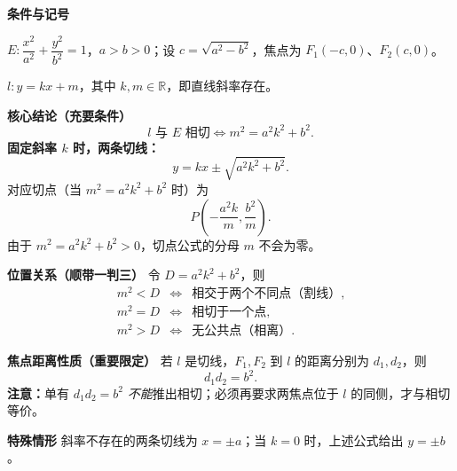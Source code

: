 \begin{statementbox}
\textbf{\textcolor{CStatement}{条件与记号}}
\begin{description}[style=nextline, leftmargin=2.8em, labelsep=0.5em, itemsep=0.35em]
    \item[\textbf{条件 1（椭圆）：}] $E:\dfrac{x^2}{a^2}+\dfrac{y^2}{b^2}=1$，$a>b>0$；设 $c=\sqrt{a^2-b^2}$，焦点为 $F_1(-c,0)$、$F_2(c,0)$。
    \item[\textbf{条件 2（直线）：}] $l:y=kx+m$，其中 $k,m\in\mathbb R$，即直线斜率存在。
\end{description}

\medskip
\textbf{\textcolor{CStatement}{核心结论（充要条件）}}
\[
\boxed{l\text{ 与 }E\text{ 相切}\iff m^2=a^2k^2+b^2.}
\]
\textbf{固定斜率 $k$ 时，两条切线：}
\[
\boxed{y=kx\pm\sqrt{a^2k^2+b^2}.}
\]
对应切点（当 $m^2=a^2k^2+b^2$ 时）为
\[
\boxed{P\left(-\frac{a^2k}{m},\frac{b^2}{m}\right).}
\]
由于 $m^2=a^2k^2+b^2>0$，切点公式的分母 $m$ 不会为零。

\medskip
\textbf{\textcolor{CStatement}{位置关系（顺带一判三）}}
令 $D=a^2k^2+b^2$，则
\[
\begin{array}{ccl}
 m^2<D &\Longleftrightarrow& \text{相交于两个不同点（割线）},\\
 m^2=D &\Longleftrightarrow& \text{相切于一个点},\\
 m^2>D &\Longleftrightarrow& \text{无公共点（相离）}.
\end{array}
\]

\medskip
\textbf{\textcolor{CStatement}{焦点距离性质（重要限定）}}
若 $l$ 是切线，$F_1,F_2$ 到 $l$ 的距离分别为 $d_1,d_2$，则
\[
\boxed{d_1d_2=b^2.}
\]
\textbf{注意：}单有 $d_1d_2=b^2$ \emph{不能}推出相切；必须再要求两焦点位于 $l$ 的同侧，才与相切等价。

\medskip
\textbf{\textcolor{CStatement}{特殊情形}}
斜率不存在的两条切线为 $\boxed{x=\pm a}$；当 $k=0$ 时，上述公式给出 $y=\pm b$。
\end{statementbox}
